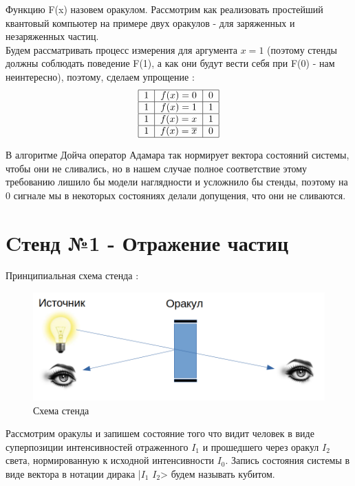 \documentclass[11pt]{article}
\begin{document}
Функцию F(x) назовем оракулом.
Рассмотрим как реализовать простейший квантовый компьютер на примере двух оракулов - для заряженных и незаряженных частиц. \\

Будем рассматривать процесс измерения для аргумента $x=1$ (поэтому стенды должны соблюдать поведение F(1), а как они будут вести себя при F(0) - нам неинтересно), поэтому, сделаем упрощение : \\

\begin{equation}
\begin{tabular}{|c|c|c|}
\hline
	1 & $f(x) = 0 $ & 0 \\
\hline
	1 & $f(x) = 1 $ & 1 \\
\hline
	1 & $f(x) = x $ & 1 \\
\hline
	1 & $f(x) = \overline x $ & 0 \\
\hline
\end{tabular}
\end{equation}

В алгоритме Дойча оператор Адамара так нормирует вектора состояний системы, чтобы они не сливались, но в нашем случае полное соответствие этому требованию лишило бы модели наглядности и усложнило бы стенды, поэтому на 0 сигнале мы в некоторых состояниях делали допущения, что они не сливаются.\\

\section{Cтенд №1 - Отражение частиц}

Принципиальная схема стенда : \\


\begin{figure}[htp]
\centering
\includegraphics[scale=0.30]{st1.png}
\caption{Схема стенда}
\label{}
\end{figure}

Рассмотрим оракулы и запишем состояние того что видит человек в виде суперпозиции интенсивностей отраженного $I_1$ и прошедшего через оракул $I_2$ света, нормированную к исходной интенсивности $I_0$. Запись состояния системы в виде вектора в нотации дирака |$I_1$ $I_2$> будем называть кубитом. \\
\end{document}
